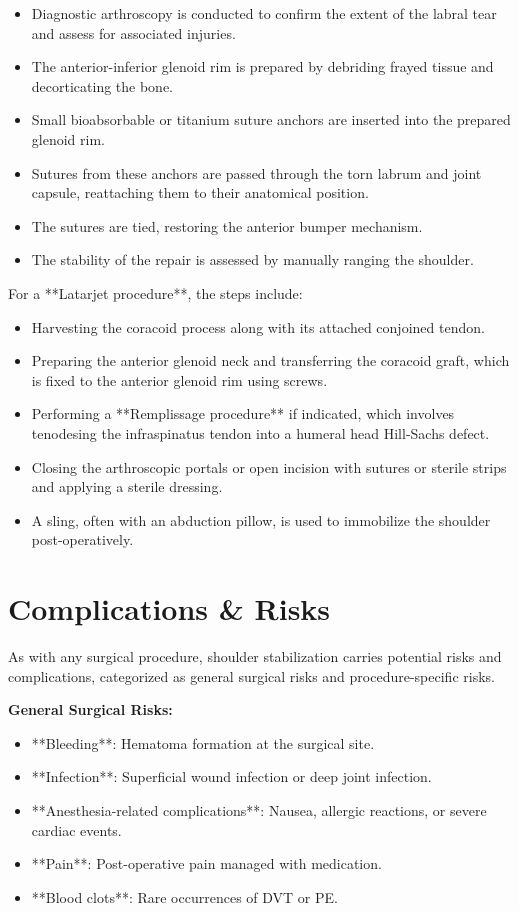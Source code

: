 \begin{itemize}
  \item Diagnostic arthroscopy is conducted to confirm the extent of the labral tear and assess for associated injuries.
  \item The anterior-inferior glenoid rim is prepared by debriding frayed tissue and decorticating the bone.
  \item Small bioabsorbable or titanium suture anchors are inserted into the prepared glenoid rim.
  \item Sutures from these anchors are passed through the torn labrum and joint capsule, reattaching them to their anatomical position.
  \item The sutures are tied, restoring the anterior bumper mechanism.
  \item The stability of the repair is assessed by manually ranging the shoulder.
\end{itemize}

For a **Latarjet procedure**, the steps include:

\begin{itemize}
  \item Harvesting the coracoid process along with its attached conjoined tendon.
  \item Preparing the anterior glenoid neck and transferring the coracoid graft, which is fixed to the anterior glenoid rim using screws.
  \item Performing a **Remplissage procedure** if indicated, which involves tenodesing the infraspinatus tendon into a humeral head Hill-Sachs defect.
  \item Closing the arthroscopic portals or open incision with sutures or sterile strips and applying a sterile dressing.
  \item A sling, often with an abduction pillow, is used to immobilize the shoulder post-operatively.
\end{itemize}

\section*{Complications \& Risks}
As with any surgical procedure, shoulder stabilization carries potential risks and complications, categorized as general surgical risks and procedure-specific risks.

\textbf{General Surgical Risks:}
\begin{itemize}
  \item **Bleeding**: Hematoma formation at the surgical site.
  \item **Infection**: Superficial wound infection or deep joint infection.
  \item **Anesthesia-related complications**: Nausea, allergic reactions, or severe cardiac events.
  \item **Pain**: Post-operative pain managed with medication.
  \item **Blood clots**: Rare occurrences of DVT or PE.
\end{itemize}

